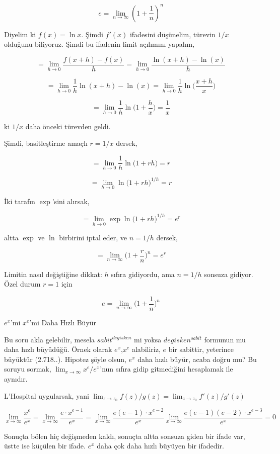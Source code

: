 \documentclass[12pt,fleqn]{article}\usepackage{../../common}
\begin{document}
$$ e = \lim _{n \to \infty} (1+ \frac{1}{n})^n $$

Diyelim ki $f(x)=\ln x$. Şimdi $f'(x)$ ifadesini düşünelim, türevin $1/x$
olduğunu biliyoruz. Şimdi bu ifadenin limit açılımını yapalım,

$$
= \lim _{h \to 0} \frac{f(x+h)-f(x)}{h}
= \lim _{h \to 0} \frac{\ln(x+h)-\ln(x)}{h} 
$$

$$
= \lim _{h \to 0} \frac{1}{h} \ln(x+h)-\ln(x)
= \lim _{h \to 0} \frac{1}{h} \ln \big(\frac{x+h}{x} \big)
$$

$$ = \lim _{h \to 0} \frac{1}{h} \ln \big( 1 + \frac{h}{x} \big) = \frac{1}{x}  $$

ki $1/x$ daha önceki türevden geldi. 

Şimdi, basitleştirme amaçlı $r=1/x$ dersek,

$$ = \lim _{h \to 0} \frac{1}{h} \ln \big( 1 + rh \big) = r  $$

$$ = \lim _{h \to 0}  \ln \big( 1 + rh \big)^{1/h} = r  $$

İki tarafın $\exp$'sini alırsak, 

$$ = \lim _{h \to 0}  \exp \ln \big( 1 + rh \big)^{1/h} = e^r  $$

altta $\exp$ ve $\ln$ birbirini iptal eder, ve $n = 1/h$ dersek,

$$ = \lim _{n \to \infty}  \big( 1 + \frac{r}{n} \big)^{n} = e^r  $$

Limitin nasıl değiştiğine dikkat: $h$ sıfıra gidiyordu, ama $n=1/h$ sonsuza
gidiyor. Özel durum $r=1$ için  

$$ e = \lim _{n \to \infty}  \big( 1 + \frac{1}{n} \big)^{n}$$

$e^x$'mi $x^e$'mi Daha Hızlı Büyür

Bu soru akla gelebilir, mesela $sabit^{degisken}$ mi yoksa
$degisken^{sabit}$ formunun mu daha hızlı büyüdüğü. Örnek olarak
$e^{x}$,$x^e$ alabiliriz, $e$ bir sabittir, yeterince büyüktür
(2.718..). Hipotez şöyle olsun, $e^{x}$ daha hızlı büyür, acaba doğru mu?
Bu soruyu sormak, $\lim_{x \to \infty} x^e / e^{x}$'nun sıfıra gidip
gitmediğini hesaplamak ile aynıdır. 

L'Hospital uygularsak, yani $\lim_{z \to z_0} f(z)/g(z) = \lim_{z \to z_0} f'(z)/g'(z)$

$$ 
\lim_{x \to \infty} \frac{x^e}{e^{x}} = 
\lim_{x \to \infty} \frac{e \cdot x^{e-1}}{e^{x}} = 
\lim_{x \to \infty} \frac{e(e-1) \cdot x^{e-2}}{e^{x}} 
\lim_{x \to \infty} \frac{e(e-1)(e-2) \cdot x^{e-3}}{e^{x}} = 0
$$

Sonuçta bölen hiç değişmeden kaldı, sonuçta altta sonsuza giden bir ifade
var, üstte ise küçülen bir ifade. $e^x$ daha çok daha hızlı büyüyen bir
ifadedir.
\end{document}
